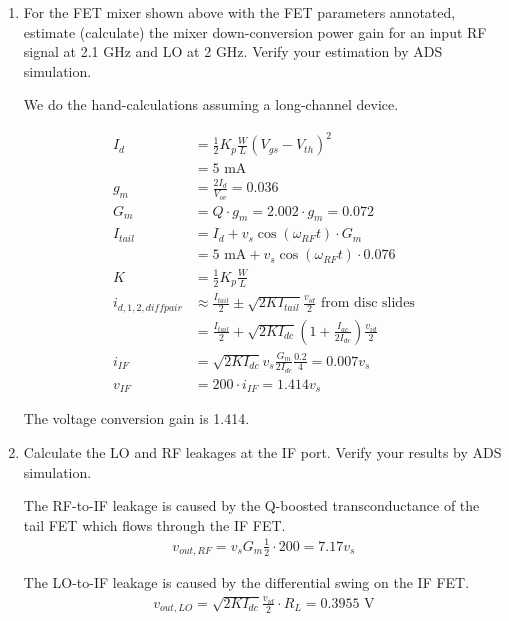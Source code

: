 \begin{enumerate}[label=(\alph*)]
    \item {\color{blue} For the FET mixer shown above with the FET parameters annotated, estimate (calculate) the mixer down-conversion power gain for an input RF signal at 2.1 GHz and LO at 2 GHz. Verify your estimation by ADS simulation.}

    We do the hand-calculations assuming a long-channel device.

    \begin{align*}
        I_d &= \frac{1}{2} K_p \frac{W}{L} (V_{gs} - V_{th})^2 \\
        &= 5 \text{ mA} \\
        g_m &= \frac{2 I_d}{V_{ov}} = 0.036 \\
        G_m &= Q \cdot g_m = 2.002 \cdot g_m = 0.072 \\
        I_{tail} &= I_d + v_s \cos(\omega_{RF} t) \cdot G_m \\
        &= 5 \text{ mA} + v_s \cos(\omega_{RF} t) \cdot 0.076 \\
        K &= \frac{1}{2} K_p \frac{W}{L} \\
        i_{d,1,2,diffpair} &\approx \frac{I_{tail}}{2} \pm \sqrt{2 K I_{tail}} \frac{v_{id}}{2} \text{ from disc slides} \\
        &= \frac{I_{tail}}{2} + \sqrt{2 K I_{dc}} (1 + \frac{I_{ac}}{2 I_{dc}}) \frac{v_{id}}{2} \\
        i_{IF} &= \sqrt{2 K I_{dc}} v_s \frac{G_m}{2 I_{dc}} \frac{0.2}{4} = 0.007 v_s \\
        v_{IF} &= 200 \cdot i_{IF} = 1.414 v_s
    \end{align*}

    The voltage conversion gain is 1.414.

    \item {\color{blue} Calculate the LO and RF leakages at the IF port. Verify your results by ADS simulation.}

    The RF-to-IF leakage is caused by the Q-boosted transconductance of the tail FET which flows through the IF FET.
    \begin{align*}
        v_{out,RF} = v_s G_m \frac{1}{2} \cdot 200 = 7.17 v_s
    \end{align*}

    The LO-to-IF leakage is caused by the differential swing on the IF FET.
    \begin{align*}
        v_{out,LO} = \sqrt{2 K I_{dc}} \frac{v_{id}}{2} \cdot R_L = 0.3955 \text{ V}
    \end{align*}


\end{enumerate}

